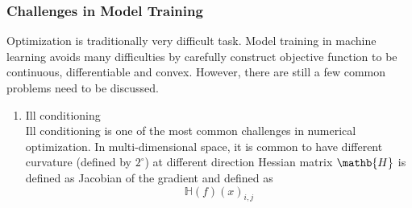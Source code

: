 \subsubsection{Challenges in Model Training}

Optimization is traditionally very difficult task. Model training in machine learning avoids many difficulties by carefully construct objective function to be continuous, differentiable and convex. However, there are still a few common problems need to be discussed. 

\begin{enumerate}
    \item Ill conditioning\\
Ill conditioning is one of the most common challenges in numerical optimization. In multi-dimensional space, it is common to have different curvature (defined by $2^\circ$) at different direction
Hessian matrix $\mathb{H}$ is defined as Jacobian of the gradient and defined as 
\begin{equation}
    \mathbb{H}(f)(x)_{i,j}
\end{equation}
\end{enumerate}


